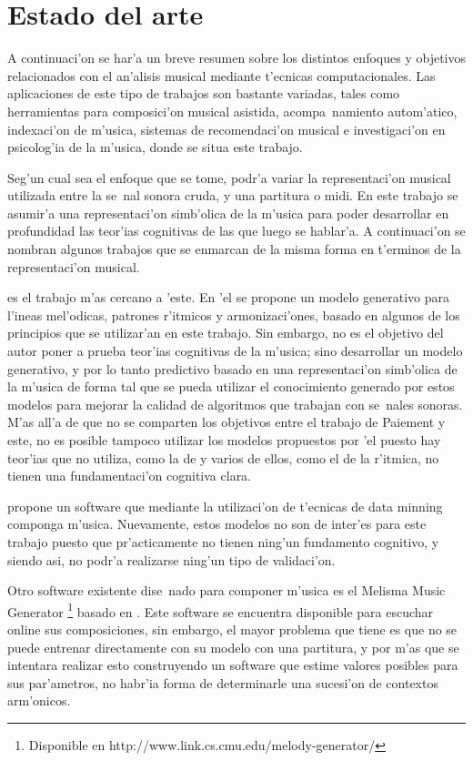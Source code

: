 \section{Estado del arte}
A continuaci'on se har'a un breve resumen sobre los distintos enfoques y objetivos relacionados con el an'alisis musical mediante
t'ecnicas computacionales. Las aplicaciones de este tipo de trabajos son bastante variadas, tales como herramientas para 
composici'on musical asistida, acompa~namiento autom'atico, indexaci'on de m'usica, sistemas de recomendaci'on musical e 
investigaci'on en psicolog'ia de la m'usica, donde se situa este trabajo.

Seg'un cual sea el enfoque que se tome, podr'a variar la representaci'on musical utilizada entre la se~nal sonora cruda, y una partitura o midi.
En este trabajo se asumir'a una representaci'on simb'olica de la m'usica para poder desarrollar en profundidad las teor'ias cognitivas de las 
que luego se hablar'a. A continuaci'on se nombran algunos trabajos que se enmarcan de la misma forma en t'erminos de la representaci'on musical.

\cite{PaieThesis} es el trabajo m'as cercano a 'este. En 'el se propone un modelo generativo para l'ineas mel'odicas, 
patrones r'itmicos y armonizaci'ones, basado en algunos de los principios que se utilizar'an en este trabajo. 
Sin embargo, no es el objetivo del autor poner a prueba teor'ias cognitivas de la m'usica; sino desarrollar un modelo generativo,
y por lo tanto predictivo basado en una representaci'on simb'olica de la m'usica de forma tal que se pueda utilizar el conocimiento generado por estos
modelos para mejorar la calidad de algoritmos que trabajan con se~nales sonoras. M'as all'a de que no se comparten los objetivos entre el trabajo de 
Paiement y este, no es posible tampoco utilizar los modelos propuestos por 'el puesto hay teor'ias que no utiliza, como la de \cite{Lerdahl2001} 
y varios de ellos, como el de la r'itmica, no tienen una fundamentaci'on cognitiva clara.

\cite{Shih-Chuan} propone un software que mediante la utilizaci'on de t'ecnicas de data minning componga m'usica. Nuevamente, estos modelos
no son de inter'es para este trabajo puesto que pr'acticamente no tienen ning'un fundamento cognitivo, y siendo asi, no podr'a realizarse 
ning'un tipo de validaci'on.


Otro software existente dise~nado para componer m'usica es el Melisma Music Generator
\footnote{Disponible en http://www.link.cs.cmu.edu/melody-generator/} basado en \cite{Temperley2004}. 
Este software se encuentra disponible para escuchar online sus composiciones, sin embargo, el mayor problema 
que tiene es que no se puede entrenar directamente con su modelo con una partitura, y por m'as que se intentara realizar esto construyendo un software 
que estime valores posibles para sus par'ametros, no habr'ia forma de determinarle una sucesi'on de contextos arm'onicos.


